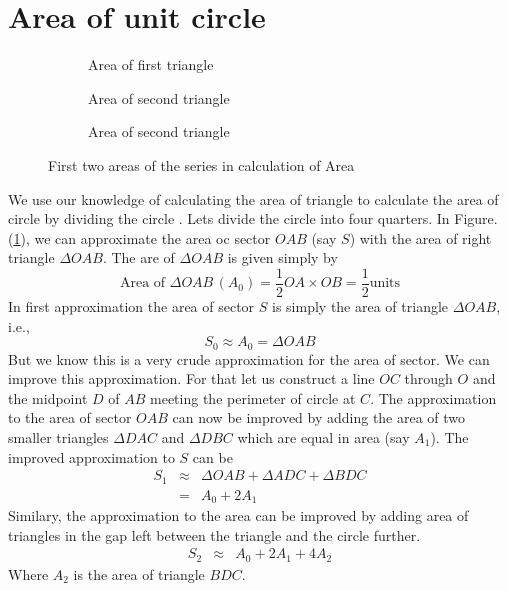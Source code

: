 \documentclass{jpconf}
\theoremstyle{definition} \newtheorem{Definition}{Def{\,}inition}
\begin{document}
\section{Area of unit circle}


\begin{figure}
	\centering
	\begin{subfigure}[b]{0.30\textwidth}
		\centering
		\scalebox{0.8}{}
		\caption{Area of first triangle}
		\label{fig:a_0}
	\end{subfigure}%
	\begin{subfigure}[b]{0.30\textwidth}
		\centering
		\scalebox{0.8}{}
		\caption{Area of second triangle}
		\label{fig:a_1}
	\end{subfigure}
	\begin{subfigure}[b]{0.30\textwidth}
		\centering
		\scalebox{0.8}{}
		\caption{Area of second triangle}
		\label{fig:a_2}
	\end{subfigure}
	\caption{First two areas of the series in calculation of Area}
\end{figure}

We use our knowledge of calculating the area of triangle to calculate the area of circle by dividing the circle . Lets divide the circle into four quarters. In Figure.(\ref{fig:a_0}), we can approximate the area oc sector $OAB$ (say $S$) with the area of right triangle $\Delta OAB$. The are of $\Delta OAB$ is given simply by 
\[\text{Area of } \Delta OAB\, (A_0) = \frac{1}{2}OA \times OB = \frac{1}{2} \text{units} \]
In first approximation the area of sector $S $ is simply the area of triangle $\Delta OAB$, i.e., \[S_0 \approx A_0 = \Delta OAB\]
But we know this is a very crude approximation for the area of sector. We can improve this approximation. For that let us construct a line $OC$ through $O$ and the midpoint $D$ of $AB$ meeting the perimeter of circle at $C$. The approximation to the area of sector $OAB$ can now be improved by adding the area of two smaller triangles $\Delta DAC$ and $\Delta DBC$ which are equal in area (say $A_1$). The improved approximation to $S$  can be 
\begin{eqnarray}
S_1 &\approx& \Delta OAB + \Delta ADC + \Delta BDC \nonumber \\
&=& A_0 + 2A_1 \nonumber
\end{eqnarray}
Similary, the approximation to the area can be improved by adding area of triangles in the gap left between the triangle and the circle further.
\begin{eqnarray}
S_2&\approx& A_0 + 2A_1+4A_2 \nonumber
\end{eqnarray}
Where $A_2$ is the area of triangle $BDC$.
\end{document}
